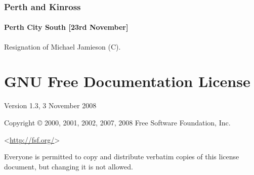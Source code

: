 \documentclass[a4paper,openany]{book}
\begin{document}
\begin{resultsiii}
\subsection*{Perth and Kinross}

\subsubsection*{Perth City South \hspace*{\fill}\nolinebreak[1]%
\enspace\hspace*{\fill}
[23rd November]}


Resignation of Michael Jamieson (C).

\end{resultsiii}

\clearpage
{}
{\scriptsize%
\frenchspacing\printindex}
\thispagestyle{plain}

\chapter*{{GNU Free Documentation License}}
\pagestyle{plain}

 Version 1.3, 3 November 2008


 Copyright \copyright{} 2000, 2001, 2002, 2007, 2008 Free Software Foundation, Inc.
 
 \bigskip
 
 <\url{http://fsf.org/}>
 
 \bigskip
 
 Everyone is permitted to copy and distribute verbatim copies
 of this license document, but changing it is not allowed.
\end{document}

